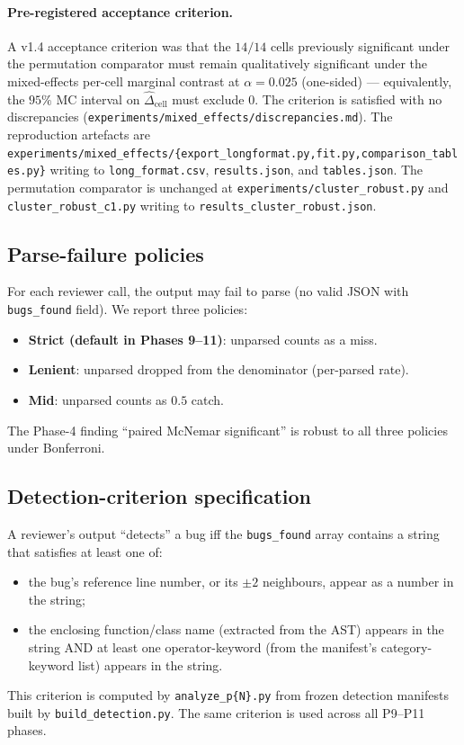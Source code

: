 \paragraph{Pre-registered acceptance criterion.} A v1.4 acceptance criterion was that the $14/14$ cells previously significant under the permutation comparator must remain qualitatively significant under the mixed-effects per-cell marginal contrast at $\alpha = 0.025$ (one-sided) --- equivalently, the $95\%$ MC interval on $\widehat{\Delta}_{\text{cell}}$ must exclude $0$. The criterion is satisfied with no discrepancies (\texttt{experiments/mixed\_effects/discrepancies.md}). The reproduction artefacts are \texttt{experiments/mixed\_effects/\{export\_longformat.py,fit.py,comparison\_tables.py\}} writing to \texttt{long\_format.csv}, \texttt{results.json}, and \texttt{tables.json}. The permutation comparator is unchanged at \texttt{experiments/cluster\_robust.py} and \texttt{cluster\_robust\_c1.py} writing to \texttt{results\_cluster\_robust.json}.

\subsection{Parse-failure policies}

For each reviewer call, the output may fail to parse (no valid JSON with \texttt{bugs\_found} field). We report three policies:
\begin{itemize}[leftmargin=2em]
\item \textbf{Strict (default in Phases 9--11)}: unparsed counts as a miss.
\item \textbf{Lenient}: unparsed dropped from the denominator (per-parsed rate).
\item \textbf{Mid}: unparsed counts as $0.5$ catch.
\end{itemize}
The Phase-4 finding ``paired McNemar significant'' is robust to all three policies under Bonferroni.

\subsection{Detection-criterion specification}

A reviewer's output ``detects'' a bug iff the \texttt{bugs\_found} array contains a string that satisfies at least one of:
\begin{itemize}[leftmargin=2em]
\item the bug's reference line number, or its $\pm 2$ neighbours, appear as a number in the string;
\item the enclosing function/class name (extracted from the AST) appears in the string AND at least one operator-keyword (from the manifest's category-keyword list) appears in the string.
\end{itemize}
This criterion is computed by \texttt{analyze\_p\{N\}.py} from frozen detection manifests built by \texttt{build\_detection.py}. The same criterion is used across all P9--P11 phases.

